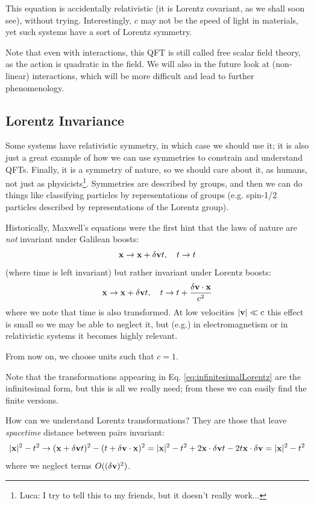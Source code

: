 This equation is accidentally relativistic (it is Lorentz covariant, as we shall soon see), without trying. Interestingly, $c$ may not be the speed of light in materials, yet such systems have a sort of Lorentz symmetry.

Note that even with interactions, this QFT is still called free scalar field theory, as the action is quadratic in the field. We will also in the future look at (non-linear) interactions, which will be more difficult and lead to further phenomenology.

\subsection{Lorentz Invariance}
Some systems have relativistic symmetry, in which case we should use it; it is also just a great example of how we can use symmetries to constrain and understand QFTs. Finally, it is a symmetry of nature, so we should care about it, as humans, not just as physicists\footnote{Luca: I try to tell this to my friends, but it doesn't really work...}. Symmetries are described by groups, and then we can do things like classifying particles by representations of groups (e.g. spin-1/2 particles described by representations of the Lorentz group).

Historically, Maxwell's equations were the first hint that the laws of nature are \emph{not} invariant under Galilean boosts:
\begin{equation}
    \mathbf{x} \to \mathbf{x} + \delta\mathbf{v}t, \quad t \to t
\end{equation}
(where time is left invariant) but rather invariant under Lorentz boosts:
\begin{equation}\label{eq:infinitesimalLorentz}
    \mathbf{x} \to \mathbf{x} + \delta\mathbf{v}t, \quad t \to t + \frac{\delta\mathbf{v} \cdot \mathbf{x}}{c^2}
\end{equation}
where we note that time is also transformed. At low velocities $\lvert \mathbf{v} \rvert \ll c$ this effect is small so we may be able to neglect it, but (e.g.) in electromagnetism or in relativistic systems it becomes highly relevant.

From now on, we choose units such that $c = 1$. 

Note that the transformations appearing in Eq. \eqref{eq:infinitesimalLorentz} are the infinitesimal form, but this is all we really need; from these we can easily find the finite versions.

How can we understand Lorentz transformations? They are those that leave \emph{spacetime} distance between pairs invariant:
\begin{equation}
    \lvert \mathbf{x} \rvert^2 - t^2 \to (\mathbf{x} + \delta\mathbf{v}t)^2 - (t + \delta\mathbf{v} \cdot \mathbf{x})^2 = \lvert \mathbf{x} \rvert^2 - t^2 + 2\mathbf{x} \cdot \delta \mathbf{v}t - 2t\mathbf{x}\cdot \delta \mathbf{v} = \lvert \mathbf{x} \rvert^2 - t^2
\end{equation}
where we neglect terms $O((\delta \mathbf{v})^2)$. 

